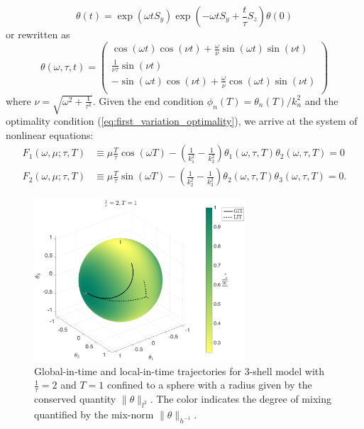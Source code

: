 \begin{equation}
	\theta(t)=\exp(\omega t S_{y})\exp\left(-\omega t S_{y}+\frac{t}{\tau}  S_{z}\right)\theta(0)
\end{equation}
or rewritten as \cite{SLA2005}
\begin{equation}
	\label{eq:3_shell_state_solution}
	\theta(\omega  ,\tau, t)=
	\left(
	\begin{array}{c}
		\cos(\omega t) \cos(\nu t) + \frac{\omega}{\nu} \sin(\omega t) \sin(\nu t)  \\
		\frac{1}{\nu\tau}  \sin(\nu t)                                              \\
		-\sin(\omega t) \cos(\nu t) + \frac{\omega}{\nu} \cos(\omega t) \sin(\nu t) \\
	\end{array}
	\right)
\end{equation}
where $\nu=\sqrt{\omega^{2}+\frac{1}{\tau^{2}}}$. Given the end condition  $\phi_{n}(T)=\theta_{n}(T)/k_{n}^{2}$ and the optimality condition (\ref{eq:first_variation_optimality}), we arrive at the system of nonlinear equations:
\begin{subequations}
	\label{eq:nonlinear_system}
	\begin{align}
	F_{1}\left(\omega , \mu ; \tau , T \right) &\equiv \mu \frac{T}{\tau}\cos(\omega T)  - \left(\frac{1}{k_{1}^2}-\frac{1}{k_{2}^2}\right) \theta_{1}\left(\omega ,\tau,T\right)  \theta_{2}\left(\omega ,\tau,T\right)=0\\
	F_{2}\left(\omega , \mu ;  \tau , T \right)  &\equiv \mu \frac{T}{\tau} \sin(\omega T) -  \left(\frac{1}{k_{2}^2}-\frac{1}{k_{3}^2}\right)\theta_{2}\left(\omega ,  \tau ,T\right)  \theta_{3}\left(\omega ,  \tau ,T\right)=0 .
	\end{align}
\end{subequations}

\begin{figure}[!ht]
	\centering
	\includegraphics[width=0.7\textwidth]{ch-shellmodel/images/trajectories}
	\caption{Global-in-time and local-in-time trajectories for 3-shell model with $\frac{1}{\tau}=2$ and $T=1$ confined to a sphere with a radius given by the conserved quantity $\|\theta\|_{l^{2}}$. The color indicates the degree of mixing quantified by the mix-norm $\|\theta\|_{h^{-1}}$. }
	\label{fig:trajectories}
\end{figure}

